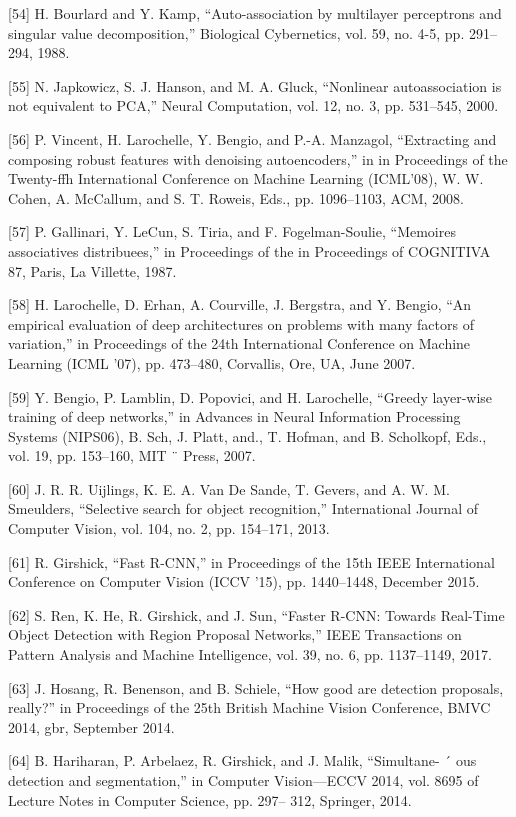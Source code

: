 \documentclass[a4paper]{article}
\begin{document}
[54] H. Bourlard and Y. Kamp, “Auto-association by multilayer perceptrons and singular value decomposition,” Biological Cybernetics, vol. 59, no. 4-5, pp. 291–294, 1988.


[55] N. Japkowicz, S. J. Hanson, and M. A. Gluck, “Nonlinear autoassociation is not equivalent to PCA,” Neural Computation, vol.
12, no. 3, pp. 531–545, 2000.


[56] P. Vincent, H. Larochelle, Y. Bengio, and P.-A. Manzagol, “Extracting and composing robust features with denoising autoencoders,” in in Proceedings of the Twenty-ffh International
Conference on Machine Learning (ICML’08), W. W. Cohen, A.
McCallum, and S. T. Roweis, Eds., pp. 1096–1103, ACM, 2008.


[57] P. Gallinari, Y. LeCun, S. Tiria, and F. Fogelman-Soulie, “Memoires associatives distribuees,” in Proceedings of the in Proceedings of COGNITIVA 87, Paris, La Villette, 1987.


[58] H. Larochelle, D. Erhan, A. Courville, J. Bergstra, and Y. Bengio,
“An empirical evaluation of deep architectures on problems
with many factors of variation,” in Proceedings of the 24th
International Conference on Machine Learning (ICML ’07), pp.
473–480, Corvallis, Ore, UA, June 2007.


[59] Y. Bengio, P. Lamblin, D. Popovici, and H. Larochelle, “Greedy
layer-wise training of deep networks,” in Advances in Neural
Information Processing Systems (NIPS06), B. Sch, J. Platt, and.,
T. Hofman, and B. Scholkopf, Eds., vol. 19, pp. 153–160, MIT ¨
Press, 2007.


[60] J. R. R. Uijlings, K. E. A. Van De Sande, T. Gevers, and A. W. M.
Smeulders, “Selective search for object recognition,” International Journal of Computer Vision, vol. 104, no. 2, pp. 154–171,
2013.


[61] R. Girshick, “Fast R-CNN,” in Proceedings of the 15th IEEE
International Conference on Computer Vision (ICCV ’15), pp.
1440–1448, December 2015.


[62] S. Ren, K. He, R. Girshick, and J. Sun, “Faster R-CNN: Towards
Real-Time Object Detection with Region Proposal Networks,”
IEEE Transactions on Pattern Analysis and Machine Intelligence,
vol. 39, no. 6, pp. 1137–1149, 2017.


[63] J. Hosang, R. Benenson, and B. Schiele, “How good are detection proposals, really?” in Proceedings of the 25th British
Machine Vision Conference, BMVC 2014, gbr, September 2014.


[64] B. Hariharan, P. Arbelaez, R. Girshick, and J. Malik, “Simultane- ´
ous detection and segmentation,” in Computer Vision—ECCV
2014, vol. 8695 of Lecture Notes in Computer Science, pp. 297–
312, Springer, 2014.
\end{document}
